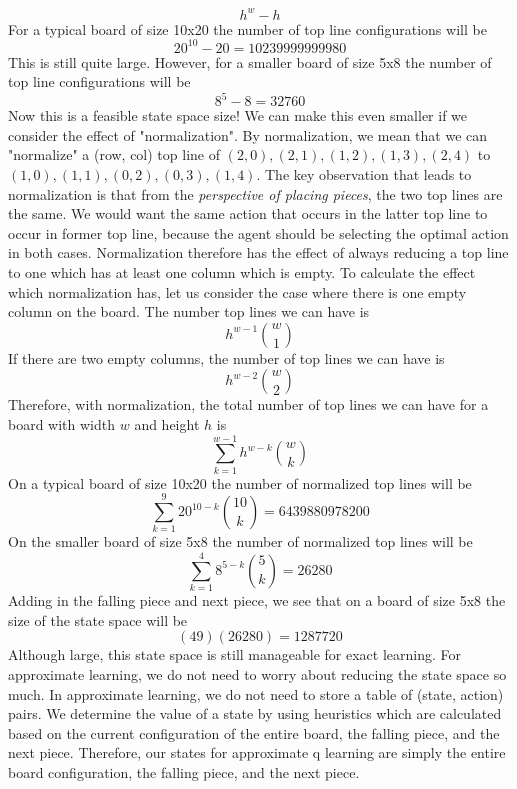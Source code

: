 \documentclass[11pt]{article}
\begin{document}
$$h^w - h$$
For a typical board of size 10x20 the number of top line configurations will be
$$20^{10} - 20 = 10239999999980$$
This is still quite large. However, for a smaller board of size 5x8 the number of top line configurations will be
$$8^5 - 8 = 32760$$
Now this is a feasible state space size! We can make this even smaller if we consider the effect of "normalization". By normalization, we mean that we can "normalize" a (row, col) top line of $(2,0),(2,1),(1,2),(1,3),(2,4)$ to $(1,0),(1,1),(0,2),(0,3),(1,4)$. The key observation that leads to normalization is that from the \textit{perspective of placing pieces}, the two top lines are the same. We would want the same action that occurs in the latter top line to occur in former top line, because the agent should be selecting the optimal action in both cases. Normalization therefore has the effect of always reducing a top line to one which has at least one column which is empty. To calculate the effect which normalization has, let us consider the case where there is one empty column on the board. The number top lines we can have is
$$h^{w-1}\binom{w}{1}$$
If there are two empty columns, the number of top lines we can have is
$$h^{w-2}\binom{w}{2}$$
Therefore, with normalization, the total number of top lines we can have for a board with width $w$ and height $h$ is
$$\sum_{k=1}^{w-1}h^{w-k}\binom{w}{k}$$
On a typical board of size 10x20 the number of normalized top lines will be
$$\sum_{k=1}^{9} 20^{10-k}\binom{10}{k} = 6439880978200$$
On the smaller board of size 5x8 the number of normalized top lines will be
$$\sum_{k=1}^{4} 8^{5-k}\binom{5}{k} = 26280$$
Adding in the falling piece and next piece, we see that on a board of size 5x8 the size of the state space will be
$$(49)(26280) = 1287720$$
Although large, this state space is still manageable for exact learning. For approximate learning, we do not need to worry about reducing the state space so much. In approximate learning, we do not need to store a table of (state, action) pairs. We determine the value of a state by using heuristics which are calculated based on the current configuration of the entire board, the falling piece, and the next piece. Therefore, our states for approximate q learning are simply the entire board configuration, the falling piece, and the next piece.
\end{document}
